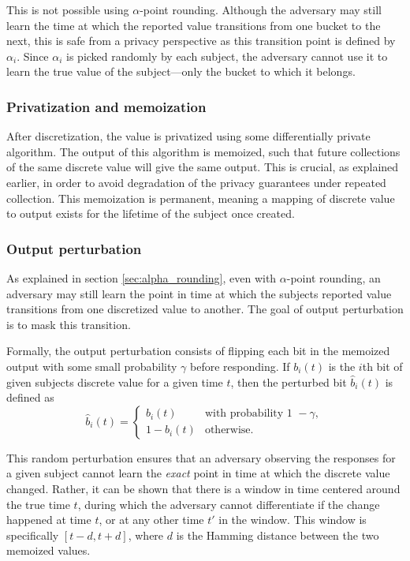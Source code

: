 \documentclass[a4paper,12pt]{article}
\begin{document}
This is not possible using $\alpha$-point rounding. Although the adversary may still learn the time at which the reported value transitions from one bucket to the next, this is safe from a privacy perspective as this transition point is defined by $\alpha_i$. Since $\alpha_i$ is picked randomly by each subject, the adversary cannot use it to learn the true value of the subject---only the bucket to which it belongs.

\subsubsection{Privatization and memoization}

After discretization, the value is privatized using some differentially private algorithm. The output of this algorithm is memoized, such that future collections of the same discrete value will give the same output. This is crucial, as explained earlier, in order to avoid degradation of the privacy guarantees under repeated collection. This memoization is permanent, meaning a mapping of discrete value to output exists for the lifetime of the subject once created.

\subsubsection{Output perturbation}

As explained in section \ref{sec:alpha_rounding}, even with $\alpha$-point rounding, an adversary may still learn the point in time at which the subjects reported value transitions from one discretized value to another. The goal of output perturbation is to mask this transition.

Formally, the output perturbation consists of flipping each bit in the memoized output with some small probability $\gamma$ before responding. If $b_i(t)$ is the $i$th bit of given subjects discrete value for a given time $t$, then the perturbed bit $\hat{b}_i(t)$ is defined as $$\hat{b}_i(t)=\begin{cases}
b_i(t) & \text{with probability 1 } - \gamma, \\
1 - b_i(t) & \text{otherwise.}
\end{cases}$$

This random perturbation ensures that an adversary observing the responses for a given subject cannot learn the \emph{exact} point in time at which the discrete value changed. Rather, it can be shown \cite[sec.~4]{microsoft_telemetry} that there is a window in time centered around the true time $t$, during which the adversary cannot differentiate if the change happened at time $t$, or at any other time $t'$ in the window. This window is specifically $[t-d, t+d]$, where $d$ is the Hamming distance between the two memoized values.
\end{document}

